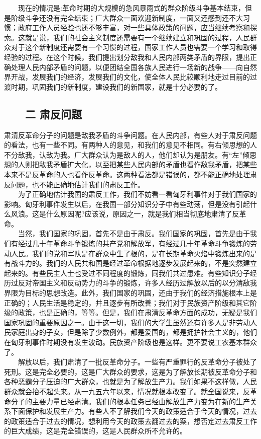 \documentclass[cn,11pt,chinese]{elegantbook}
\def\myformat#1{\hfil\hfil #1}
\begin{document}
　　现在的情况是:革命时期的大规模的急风暴雨式的群众阶级斗争基本结束，但是阶级斗争还没有完全结束；广大群众一面欢迎新制度，一面又还感到还不大习惯；政府工作人员经验也还不够丰富，对一些具体政策的问题，应当继续考察和探索。这就是说，我们的社会主义制度还需要有一个继续建立和巩固的过程，人民群众对于这个新制度还需要有一个习惯的过程，国家工作人员也需要一个学习和取得经验的过程。在这个时候，我们提出划分敌我和人民内部两类矛盾的界限，提出正确处理人民内部矛盾的问题，以便团结全国各族人民进行一场新的战争——向自然界开战，发展我们的经济，发展我们的文化，使全体人民比较顺利地走过目前的过渡时期，巩固我们的新制度，建设我们的新国家，就是十分必要的了。\\
\subsection*{\myformat{　　二 肃反问题}}
肃清反革命分子的问题是敌我矛盾的斗争问题。在人民内部，有些人对于肃反问题的看法，也有一些不同。有两种人的意见，和我们的意见不相同。有右倾思想的人不分敌我，认敌为我。广大群众认为是敌人的人，他们却认为是朋友。有“左”倾思想的人则把敌我矛盾扩大化，以至把某些人民内部的矛盾也看作敌我矛盾，把某些本来不是反革命的人也看作反革命。这两种看法都是错误的，都不能正确地处理肃反问题，也不能正确地估计我们的肃反工作。\\
　　为了正确地估计我国的肃反工作，我们不妨看一看匈牙利事件对于我们国家的影响。匈牙利事件发生以后，在我国一部分知识分子中有些动荡，但是没有引起什么风浪。这是什么原因呢?应该说，原因之一，就是我们相当彻底地肃清了反革命。\\
　　当然，我们国家的巩固，首先不是由于肃反。我们国家的巩固，首先是由于我们有经过几十年革命斗争锻炼的共产党和解放军，有经过几十年革命斗争锻炼的劳动人民。我们的党和军队是在群众中生了根的，是在长期革命火焰中锻炼出来的是有战斗力的。我们的人民共和国是经过革命根据地逐步发展起来的，不是突然建立起来的。有些民主人士也受过不同程度的锻炼，同我们共过患难。有些知识分子经历过反对帝国主义和反动势力的斗争的锻炼，许多人经历过解放以后的以分清敌我界限为目标的思想改造。此外，我们国家的巩固，还由于我们的经济措施根本上是正确的；人民生活是稳定的，并且逐步有所改善；我们对于民族资产阶级和其它阶级的政策，也是正确的，等等。但是，我们在肃清反革命方面的成功，无疑是我们国家巩固的重要原因之一。由于这一切，我们的大学生虽然还有许多人是非劳动人民家庭出身的子女，但是除了少数例外，都是爱国的，都是拥护社会主义的，他们在匈牙利事件时期没有发生波动。民族资产阶级也是这样。更不要说工农基本群众了。\\
　　解放以后，我们肃清了一批反革命分子。一些有严重罪行的反革命分子被处了死刑。这是完全必要的，这是广大群众的要求，这是为了解放长期被反革命分子和各种恶霸分子压迫的广大群众，也就是为了解放生产力。我们如果不这样做，人民群众就会抬不起头来。从一九五六年以来，情况就根本改变了。就全国说来，反革命分子的主要力量已经肃清。我们的根本任务已经由解放生产力变为在新的生产关系下面保护和发展生产力。有些人不了解我们今天的政策适合于今天的情况，过去的政策适合于过去的情况，想利用今天的政策去翻过去的案，想否定过去肃反工作的巨大成绩，这是完全错误的，这是人民群众所不允许的。\\
\end{document}

